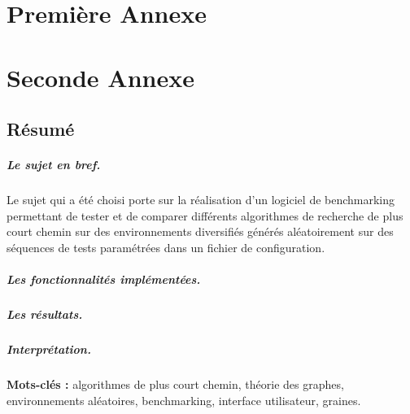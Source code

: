 \documentclass[pidr]{tnreport}
\begin{document}
\chapter{Première Annexe}
\clearpage

\chapter{Seconde Annexe}


\clearpage
\thispagestyle{empty}

\section*{Résumé}

\paragraph{Le sujet en bref.}
Le sujet qui a été choisi porte sur la réalisation d'un logiciel de benchmarking permettant de tester et de comparer différents algorithmes de recherche de plus court chemin sur des environnements diversifiés générés aléatoirement sur des séquences de tests paramétrées dans un fichier de configuration. \linebreak

\paragraph{Les fonctionnalités implémentées.}

\paragraph{Les résultats.}

\paragraph{Interprétation.}

{\bf Mots-clés :} algorithmes de plus court chemin, théorie des graphes, environnements aléatoires, benchmarking, interface utilisateur, graines.
\end{document}

